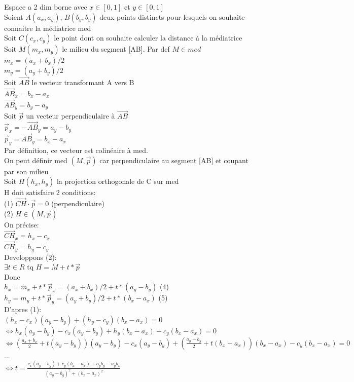 \documentclass{article}
\begin{document}
Espace a 2 dim borne avec $x \in [0, 1]$ et $y \in [0, 1] $\\

Soient $A(a_x, a_y)$, $B(b_y, b_y)$ deux points distincts pour lesquels on souhaite connaitre la médiatrice med\\

Soit $C(c_x, c_y)$ le point dont on souhaite calculer la distance à la médiatrice\\

Soit $M(m_x, m_y)$ le milieu du segment [AB]. Par def $M \in med$\\
$m_x = (a_x+b_x)/2$\\
$m_y = (a_y+b_y)/2$\\

Soit $\vec{AB}$ le vecteur transformant A vers B\\
$\vec{AB}_x = b_x-a_x$\\
$\vec{AB}_y = b_y-a_y$\\

Soit $\vec{p}$ un vecteur perpendiculaire à $\vec{AB}$\\
$\vec{p}_x = -\vec{AB}_y = a_y-b_y$\\
$\vec{p}_y = \vec{AB}_y = b_x-a_x$\\

Par définition, ce vecteur est colinéaire à med.\\
On peut définir med $(M, \vec{p})$ car perpendiculaire au segment [AB] et coupant par son milieu\\

Soit $H(h_x, h_y)$ la projection orthogonale de C sur med\\
H doit satisfaire 2 conditions:\\
(1) $\vec{CH} \cdot \vec{p} = 0$ (perpendiculaire)\\
(2) $H \in (M,\vec{p})$\\

On précise:\\
$\vec{CH}_x = h_x-c_x$\\
$\vec{CH}_y = h_y-c_y$\\

Developpons (2):\\
$\exists t \in R$ tq $H = M + t*\vec{p}$\\
Donc\\
$h_x = m_x + t*\vec{p}_x = (a_x+b_x)/2 + t*(a_y - b_y)$ (4)\\
$h_y = m_y + t*\vec{p}_y = (a_y+b_y)/2 + t*(b_x - a_x)$ (5)\\

D'apres (1):\\
$(h_x-c_x)(a_y-b_y) + (h_y-c_y)(b_x-a_x) = 0$\\
$\Leftrightarrow h_x(a_y-b_y) - c_x(a_y - b_y) + h_y(b_x - a_x) - c_y(b_x - a_x) = 0$\\
$\Leftrightarrow (\frac{a_x+b_x}{2} + t(a_y - b_y))(a_y-b_y) - c_x(a_y - b_y) + (\frac{a_y+b_y}{2} + t(b_x - a_x))(b_x - a_x) - c_y(b_x - a_x) = 0$\\
...\\
$\Leftrightarrow t = \frac{c_x(a_y-b_y)+c_y(b_x-a_x)+a_yb_y-a_yb_x}{(a_y-b_y)^2 + (b_x-a_x)^2}$\\
\end{document}

